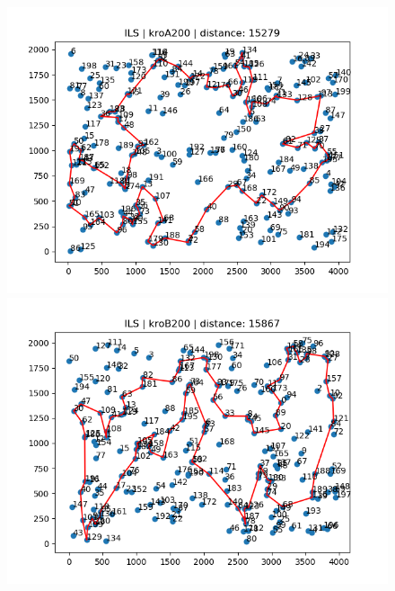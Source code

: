 \documentclass{article}
\begin{document}
\begin{figure}[h!]
  \centering
  \begin{minipage}[b]{0.8\textwidth}
    \includegraphics[width=\textwidth]{ils_kroA200.png}
  \end{minipage}

  \begin{minipage}[b]{0.8\textwidth}
    \includegraphics[width=\textwidth]{ils_kroB200.png}
  \end{minipage}
  
\end{figure}
    
\end{document}
